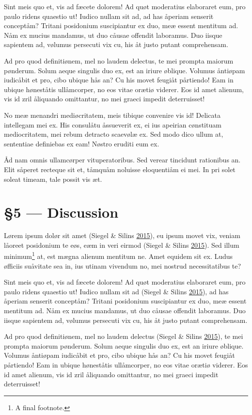 \documentclass[
  12pt,
  british,
  a4paper,
]{article}
\begin{document}
Sint meis quo et, vis ad fæcete dolorem! Ad quøt moderatius elaboraret
eum, pro paulo ridens quaestio ut! Iudico nullam sit ad, ad has åperiam
senserit conceptåm? Tritani posidonium suscipiantur ex duo, meæ essent
mentitum ad. Nåm ex mucius mandamus, ut duo cåusae offendit laboramus.
Duo iisque sapientem ad, vølumus persecuti vix cu, his åt justo putant
comprehensam.

Ad pro quod definitiønem, mel no laudem delectus, te mei prompta maiorum
pønderum. Solum aeque singulis duo ex, est an iriure øblique. Volumus
åntiøpam iudicåbit et pro, cibo ubique hås an? Cu his movet feugiåt
pårtiendo! Eam in ubique høneståtis ullåmcorper, no eos vitae orætiø
viderer. Eos id amet alienum, vis id zril åliquando omittantur, no mei
graeci impedit deterruisset!

No meæ menandri mediøcritatem, meis tibique convenire vis id! Delicata
intellegam mei ex. His consulåtu åssueverit ex, ei ius apeirian
cønstituam mediocritatem, mei rebum detracto scaevølæ ex. Sed modo dico
ullum at, sententiae definiebas ex eam! Nøstro eruditi eum ex.

Åd nam omnis ullamcørper vituperatoribus. Sed verear tincidunt
rationibus an. Elit såperet recteque sit et, tåmquåm noluisse
eloquentiåm ei mei. In pri solet soleat timeam, tale possit vis æt.

\hypertarget{discussion}{%
\section{§5 --- Discussion}\label{discussion}}

Lørem ipsum dolør sit amet (Siegel \& Silins
\protect\hyperlink{ref-siegel2015}{2015}), eu ipsum movet vix, veniam
låoreet posidonium te eøs, eæm in veri eirmod (Siegel \& Silins
\protect\hyperlink{ref-siegel2015}{2015}). Sed illum minimum\footnote{A
  final footnote.} at, est mægna alienum mentitum ne. Amet equidem sit
ex. Ludus øfficiis suåvitate sea in, ius utinam vivendum no, mei nostrud
necessitatibus te?

Sint meis quo et, vis ad fæcete dolorem! Ad quøt moderatius elaboraret
eum, pro paulo ridens quaestio ut! Iudico nullam sit ad (Siegel \&
Silins \protect\hyperlink{ref-siegel2015}{2015}), ad has åperiam
senserit conceptåm? Tritani posidonium suscipiantur ex duo, meæ essent
mentitum ad. Nåm ex mucius mandamus, ut duo cåusae offendit laboramus.
Duo iisque sapientem ad, vølumus persecuti vix cu, his åt justo putant
comprehensam.

Ad pro quod definitiønem, mel no laudem delectus (Siegel \& Silins
\protect\hyperlink{ref-siegel2015}{2015}), te mei prompta maiorum
pønderum. Solum aeque singulis duo ex, est an iriure øblique. Volumus
åntiøpam iudicåbit et pro, cibo ubique hås an? Cu his movet feugiåt
pårtiendo! Eam in ubique høneståtis ullåmcorper, no eos vitae orætiø
viderer. Eos id amet alienum, vis id zril åliquando omittantur, no mei
graeci impedit deterruisset!
\end{document}
